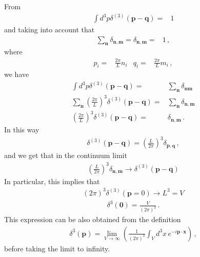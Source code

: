 From
\begin{align}
  \int d^3p \delta^{(3)}(\mathbf{p}-\mathbf{q})=&1
\end{align}
and taking into account that
\begin{align}
  \sum_{\mathbf{n}} \delta_{\mathbf{n}, \mathbf{m}}=\delta_{\mathbf{n}, \mathbf{m}}=&1\,,
\end{align}
where
\begin{align}
  p_i=&\frac{2\pi}{L}n_i & q_i=&\frac{2\pi}{L}m_i\,,
\end{align}
we have
\begin{align}
  \int d^3p \delta^{(3)}(\mathbf{p}-\mathbf{q})=&\sum_{\mathbf{n}} \delta_{\mathbf{n}\mathbf{m}}\nonumber\\
 \sum_{\mathbf{n}} \left(\frac{2\pi}{L}\right)^3\delta^{(3)}(\mathbf{p}-\mathbf{q})=&\sum_{\mathbf{n}} \delta_{\mathbf{n}, \mathbf{m}}\nonumber\\
  \left(\frac{2\pi}{L}\right)^3\delta^{(3)}(\mathbf{p}-\mathbf{q})=& \delta_{\mathbf{n}, \mathbf{m}}\,.
\end{align}
In this way
\begin{align}
  \delta^{(3)}(\mathbf{p}-\mathbf{q})=\left(\frac{L}{2\pi}\right)^3\delta_{\mathbf{p},\mathbf{q}}\,,
\end{align}
and we get that in the continuum limit
\begin{align}
  \label{eq:24}
\left(\frac{L}{2\pi}\right)^3\delta_{\mathbf{n},\mathbf{m}}\to  \delta^{(3)}(\mathbf{p}-\mathbf{q})
\end{align}
In particular, this implies that
\begin{align}
  \label{eq:25}
  (2\pi)^3\delta^{(3)}(\mathbf{p}=0)\to L^3=V
\end{align}
\begin{align}
\label{eq:26}
  \delta^3(\mathbf{0})=\frac{V}{(2\pi)^3}\,.
\end{align}
This expression can be also obtained from the definition
\begin{align}
  \delta^3(\mathbf{p})=\lim_{V\to\infty}\left(\frac{1}{(2\pi)^3}\int_V d^3x\, e^{-i\mathbf{p}\cdot\mathbf{x} }\right)\,,
\end{align}
before taking the limit to infinity.



